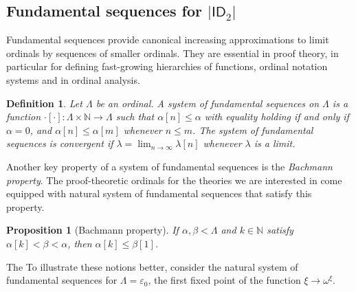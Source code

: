 \documentclass{amsart}
\theoremstyle{plain}
\theoremstyle{plain}
\newtheorem{proposition}[theorem]{Proposition}
\newtheorem*{definition}{Definition}
\newcommand{\ID}{\mathsf{ID}}
\newcommand{\al}{{\alpha}}
\newcommand{\be}{{\beta}}
\newcommand{\la}{\lambda}
\newcommand{\om}{\omega}
\newcommand\Nat{\mathbb{N}}
\begin{document}
\subsection{Fundamental sequences for \texorpdfstring{$|\ID_2|$}{ID2} }\label{subsec:FundSeqBach}
Fundamental sequences provide canonical increasing approximations to limit ordinals
by sequences of smaller ordinals. They are essential in proof theory, in particular for defining fast-growing hierarchies of functions, ordinal notation systems and in ordinal analysis. 

\begin{definition}
Let $\Lambda$ be an ordinal. A {\em system of fundamental sequences on $\Lambda$} is a function $\cdot [\cdot] \colon \Lambda \times \mathbb N \to \Lambda$ such that $  \alpha [n] \leq \alpha$ with equality holding if and only if $\alpha = 0$, and $\alpha[n] \leq \alpha[m]$ whenever $n\leq m$.
The system of fundamental sequences is {\em convergent} if $\lambda  = \lim_{n\to \infty} \lambda[n]$ whenever $\lambda $ is a limit.
\end{definition}

Another key property of a system of fundamental sequences is the {\em Bachmann property}. The proof-theoretic ordinals for the theories we are interested in come equipped with natural system of fundamental sequences that satisfy this property. 
\begin{proposition}[Bachmann property]
    If $\al,\be <\Lambda$ and $k\in \Nat$ satisfy  $\al[k] < \be < \al$, then $\al[k] \leq \be[1]$.
\end{proposition}
The 
To illustrate these notions better, consider the natural system of fundamental sequences for $\Lambda=\varepsilon_0$, the first fixed point of the function $\xi \to \om^{\xi}$. 
\end{document}
